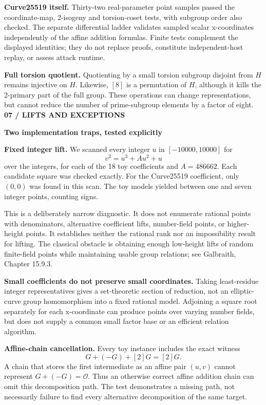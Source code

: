 \documentclass[11pt]{article}
\newcommand{\titleline}[2]{{\small\color{teal}\textbf{#1}}\par{\LARGE\color{ink}\textbf{#2}}\par\vspace{3mm}}
\begin{document}
\textbf{Curve25519 itself.} Thirty-two real-parameter point samples passed the coordinate-map, 2-isogeny and torsion-coset tests, with subgroup order also checked. The separate differential ladder validates sampled scalar x-coordinates independently of the affine addition formulas. Finite tests complement the displayed identities; they do not replace proofs, constitute independent-host replay, or assess attack runtime.

\textbf{Full torsion quotient.} Quotienting by a small torsion subgroup disjoint from $H$ remains injective on $H$. Likewise, $[8]$ is a permutation of $H$, although it kills the 2-primary part of the full group. These operations can change representations, but cannot reduce the number of prime-subgroup elements by a factor of eight.
\newpage
\titleline{07 / LIFTS AND EXCEPTIONS}{Two implementation traps, tested explicitly}
\textbf{Fixed integer lift.} We scanned every integer $u$ in $[-10000,10000]$ for
\[
 v^2=u^3+Au^2+u
\]
over the integers, for each of the 18 toy coefficients and $A=486662$. Each candidate square was checked exactly. For the Curve25519 coefficient, only $(0,0)$ was found in this scan. The toy models yielded between one and seven integer points, counting signs.

This is a deliberately narrow diagnostic. It does not enumerate rational points with denominators, alternative coefficient lifts, number-field points, or higher-height points. It establishes neither the rational rank nor an impossibility result for lifting. The classical obstacle is obtaining enough low-height lifts of random finite-field points while maintaining usable group relations; see Galbraith, Chapter 15.9.3.

\textbf{Small coefficients do not preserve small coordinates.} Taking least-residue integer representatives gives a set-theoretic section of reduction, not an elliptic-curve group homomorphism into a fixed rational model. Adjoining a square root separately for each x-coordinate can produce points over varying number fields, but does not supply a common small factor base or an efficient relation algorithm.

\textbf{Affine-chain cancellation.} Every toy instance includes the exact witness
\[
 G+(-G)+[2]G=[2]G.
\]
A chain that stores the first intermediate as an affine pair $(u,v)$ cannot represent $G+(-G)=\mathcal O$. Thus an otherwise correct affine addition chain can omit this decomposition path. The test demonstrates a missing path, not necessarily failure to find every alternative decomposition of the same target.
\end{document}
